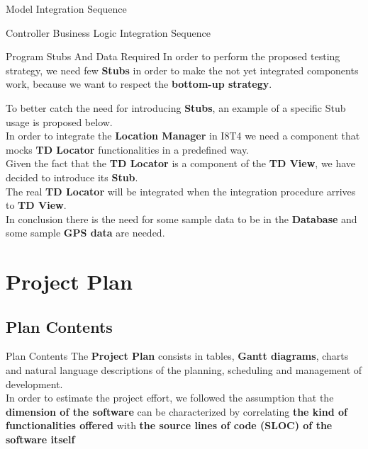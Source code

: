 \documentclass{../common/latex_classes/pdf_presentation}
\begin{document}
	\begin{frame}{Model Integration Sequence}
	\end{frame}
	\begin{frame}{Controller Business Logic Integration Sequence}
	\end{frame}
	\begin{frame}{Program Stubs And Data Required}
		In order to perform the proposed testing strategy, we need few \textbf{Stubs} in order to make the not yet integrated components work, because we want to respect the \textbf{bottom-up strategy}.\par
		\medskip
		To better catch the need for introducing \textbf{Stubs}, an example of a specific Stub usage is proposed below.\\
		In order to integrate the \textbf{Location Manager} in I8T4 we need a component that mocks \textbf{TD Locator} functionalities in a predefined way.\\
		Given the fact that the \textbf{TD Locator} is a component of the \textbf{TD View}, we have decided to introduce its \textbf{Stub}.\\
		The real \textbf{TD Locator} will be integrated when the integration procedure arrives to \textbf{TD View}.\\
		\medskip
		In conclusion there is the need for some sample data to be in the \textbf{Database} and some sample \textbf{GPS data} are needed.
	\end{frame}
	\section{Project Plan}
	\subsection{Plan Contents} 
	\begin{frame}{Plan Contents}
		The \textbf{Project Plan} consists in tables, \textbf{Gantt diagrams}, charts and natural language descriptions of the planning, scheduling and management of \myTaxiService{} development. \\
		\medskip
		In order to estimate the project effort, we followed the assumption that the \textbf{dimension of the software} can be characterized by correlating \textbf{the kind of functionalities offered} with \textbf{the source lines of code (SLOC) of the software itself}
	\end{frame}
\end{document}
